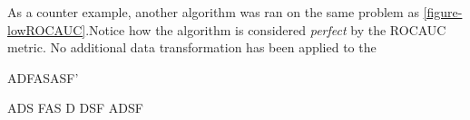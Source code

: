 As a counter example, another algorithm was ran on the same problem as \ref{figure-lowROCAUC}.Notice how the algorithm is considered \textit{perfect} by the ROCAUC metric. No additional data transformation has been applied to the

ADFASASF'

ADS
FAS
D
DSF
ADSF